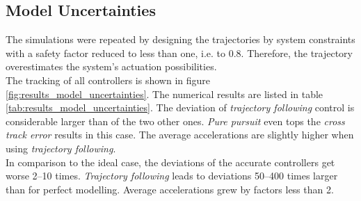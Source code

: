\subsection{Model Uncertainties}
\label{sub:results_model_uncertainties}

The simulations were repeated by designing the trajectories by system constraints with a safety factor reduced to less than one, i.e. to \num{0.8}. Therefore, the trajectory overestimates the system's actuation possibilities. \\
The tracking of all controllers is shown in figure \ref{fig:results_model_uncertainties}. The numerical results are listed in table \ref{tab:results_model_uncertainties}. The deviation of \textit{trajectory following} control is considerable larger than of the two other ones. \textit{Pure pursuit} even tops the \textit{cross track error} results in this case. The average accelerations are slightly higher when using \textit{trajectory following}.
\\
In comparison to the ideal case, the deviations of the accurate controllers get worse \numrange{2}{10} times. \textit{Trajectory following} leads to deviations \numrange{50}{400} times larger than for perfect modelling. Average accelerations grew by factors less than \num{2}.


